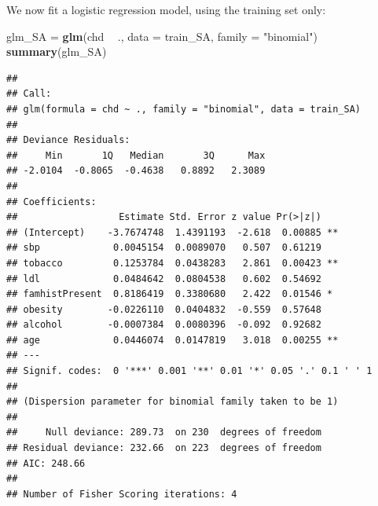 \documentclass[10pt,ignorenonframetext,]{beamer}
\newenvironment{Shaded}{\begin{snugshade}}{\end{snugshade}}
\newcommand{\KeywordTok}[1]{\textcolor[rgb]{0.13,0.29,0.53}{\textbf{#1}}}
\newcommand{\DataTypeTok}[1]{\textcolor[rgb]{0.13,0.29,0.53}{#1}}
\newcommand{\StringTok}[1]{\textcolor[rgb]{0.31,0.60,0.02}{#1}}
\newcommand{\OperatorTok}[1]{\textcolor[rgb]{0.81,0.36,0.00}{\textbf{#1}}}
\newcommand{\NormalTok}[1]{#1}
\begin{document}
\begin{frame}[fragile]

We now fit a logistic regression model, using the training set only:

\scriptsize

\begin{Shaded}
\begin{Highlighting}[]
\NormalTok{glm_SA =}\StringTok{ }\KeywordTok{glm}\NormalTok{(chd }\OperatorTok{~}\StringTok{ }\NormalTok{., }\DataTypeTok{data =}\NormalTok{ train_SA, }\DataTypeTok{family =} \StringTok{"binomial"}\NormalTok{)}
\KeywordTok{summary}\NormalTok{(glm_SA)}
\end{Highlighting}
\end{Shaded}

\begin{verbatim}
## 
## Call:
## glm(formula = chd ~ ., family = "binomial", data = train_SA)
## 
## Deviance Residuals: 
##     Min       1Q   Median       3Q      Max  
## -2.0104  -0.8065  -0.4638   0.8892   2.3089  
## 
## Coefficients:
##                  Estimate Std. Error z value Pr(>|z|)   
## (Intercept)    -3.7674748  1.4391193  -2.618  0.00885 **
## sbp             0.0045154  0.0089070   0.507  0.61219   
## tobacco         0.1253784  0.0438283   2.861  0.00423 **
## ldl             0.0484642  0.0804538   0.602  0.54692   
## famhistPresent  0.8186419  0.3380680   2.422  0.01546 * 
## obesity        -0.0226110  0.0404832  -0.559  0.57648   
## alcohol        -0.0007384  0.0080396  -0.092  0.92682   
## age             0.0446074  0.0147819   3.018  0.00255 **
## ---
## Signif. codes:  0 '***' 0.001 '**' 0.01 '*' 0.05 '.' 0.1 ' ' 1
## 
## (Dispersion parameter for binomial family taken to be 1)
## 
##     Null deviance: 289.73  on 230  degrees of freedom
## Residual deviance: 232.66  on 223  degrees of freedom
## AIC: 248.66
## 
## Number of Fisher Scoring iterations: 4
\end{verbatim}

\normalsize

\end{frame}
\end{document}
